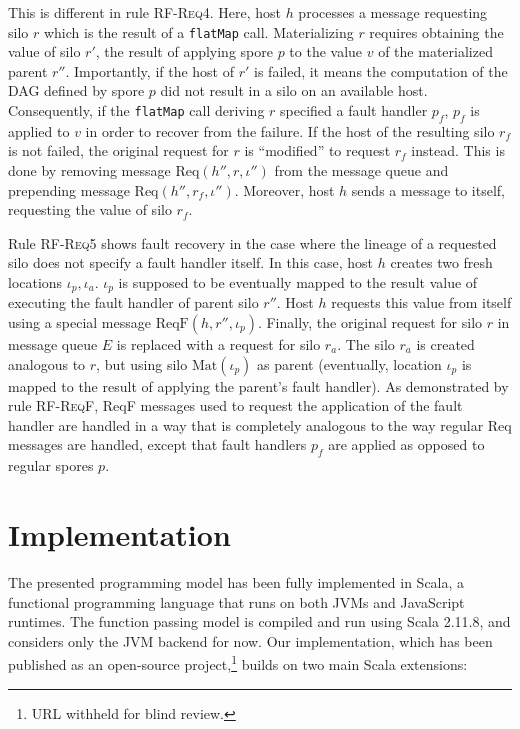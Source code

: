 \documentclass[10pt]{sigplanconf}
\theoremstyle{definition}
\theoremstyle{definition}
\begin{document}
This is different in rule \textsc{RF-Req4}. Here, host $h$ processes a message
requesting silo $r$ which is the result of a \texttt{flatMap} call.
Materializing $r$ requires obtaining the value of silo $r'$, the result of
applying spore $p$ to the value $v$ of the materialized parent $r''$.
Importantly, if the host of $r'$ is failed, it means the computation of the DAG
defined by spore $p$ did not result in a silo on an available host.
Consequently, if the \texttt{flatMap} call deriving $r$ specified a fault
handler $p_f$, $p_f$ is applied to $v$ in order to recover from the failure.
If the host of the resulting silo $r_f$ is not failed, the original request for
$r$ is ``modified'' to request $r_f$ instead. This is done by removing message
$\text{Req}(h'', r, \iota'')$ from the message queue and prepending message
$\text{Req}(h'', r_f, \iota'')$. Moreover, host $h$ sends a message to itself,
requesting the value of silo $r_f$.

Rule \textsc{RF-Req5} shows fault recovery in the case where the lineage of a
requested silo does not specify a fault handler itself. In this case, host $h$
creates two fresh locations $\iota_p, \iota_a$. $\iota_p$ is supposed to be
eventually mapped to the result value of executing the fault handler of parent
silo $r''$. Host $h$ requests this value from itself using a special message
$\text{ReqF}(h, r'', \iota_p)$. Finally, the original request for silo $r$ in
message queue $E$ is replaced with a request for silo $r_a$. The silo $r_a$ is
created analogous to $r$, but using silo $\text{Mat}(\iota_p)$ as parent
(eventually, location $\iota_p$ is mapped to the result of applying the
parent's fault handler). As demonstrated by rule \textsc{RF-ReqF}, ReqF
messages used to request the application of the fault handler are handled in a
way that is completely analogous to the way regular Req messages are handled,
except that fault handlers $p_f$ are applied as opposed to regular spores $p$.

\section{Implementation}
\label{sec:implementation}

The presented programming model has been fully implemented in Scala, a
functional programming language that runs on both JVMs and JavaScript runtimes.
The function passing model is compiled and run using Scala 2.11.8, and considers only the JVM backend
for now. Our implementation, which has been published as an open-source
project,\footnote{URL withheld for blind review.} builds on two
main Scala extensions:
\end{document}
